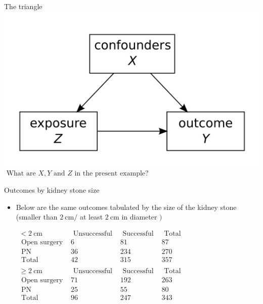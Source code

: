 \documentclass[10pt]{beamer}\usepackage[]{graphicx}\usepackage[]{color}
\begin{document}
\begin{frame}{The triangle}
\centering
\includegraphics[width=\linewidth]{triangle.png}
\vspace{0.3in}
$\text { What are } X, Y \text { and } Z \text { in the present example? }$
\end{frame}


\begin{frame}{Outcomes by kidney stone size}
	\begin{itemize}
		\item Below are the same outcomes tabulated by the size of the kidney stone (smaller than $2 \mathrm{~cm} /$ at least $2 \mathrm{~cm}$ in diameter $)$
		
		\vspace{0.2in}
		
		
$\begin{array}{lccc}
	<2 \mathrm{~cm} & \text { Unsuccessful } & \text { Successful } & \text { Total } \\
	\text { Open surgery } & 6 & 81 & 87 \\
	\text { PN } & 36 & 234 & 270 \\
	\text { Total } & 42 & 315 & 357 \\
	& & & \\
	\geq 2 \mathrm{~cm} & \text { Unsuccessful } & \text { Successful } & \text { Total } \\
	\text { Open surgery } & 71 & 192 & 263 \\
	\text { PN } & 25 & 55 & 80 \\
	\text { Total } & 96 & 247 & 343
\end{array}$
	\end{itemize}
\end{frame}
\end{document}
